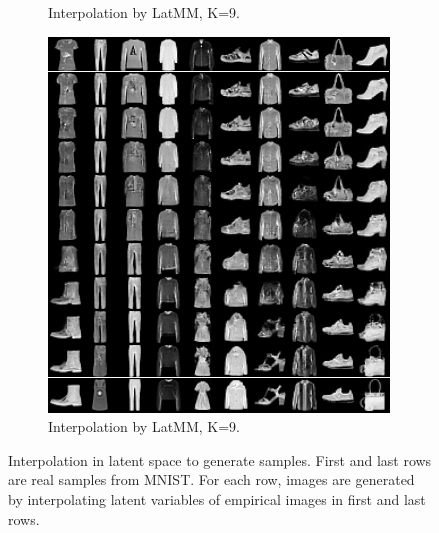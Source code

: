 \begin{figure}[!t]
\begin{subfigure}[b]{0.3\textwidth}
    \caption{Interpolation by LatMM, K=9.}\label{fig-interpo-latmm2}
  \end{subfigure}
  \hspace{10pt}
  \begin{subfigure}[b]{0.3\textwidth}
    \centering
    \includegraphics[width=1\linewidth]{images/fashion-mnist/interpolation/interpoFashion_heter_LatMM_K9_grid.png}
    \caption{Interpolation by LatMM, K=9.}\label{fig-interpo-latmm3}
  \end{subfigure}
  \caption{Interpolation in latent space to generate samples. First
    and last rows are real samples from MNIST. For each row, images
    are generated by interpolating latent variables of empirical
    images in first and last rows.}\label{fig-interpo}
  \label{fig-app-interpolation}
\end{figure}


